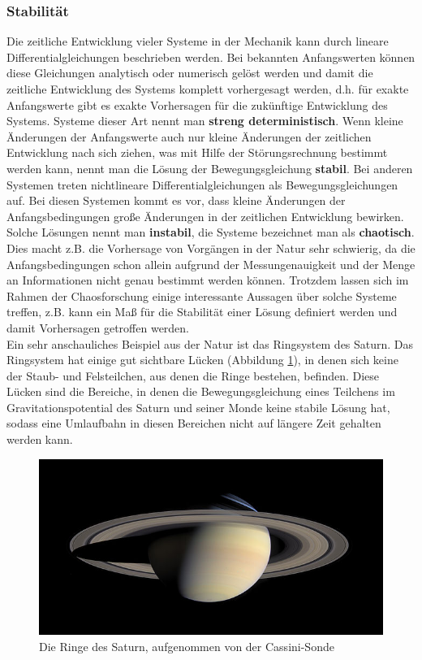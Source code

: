 \subsubsection{Stabilität}
Die zeitliche Entwicklung vieler Systeme in der Mechanik kann durch lineare Differentialgleichungen beschrieben werden. Bei bekannten Anfangswerten können diese Gleichungen analytisch oder numerisch gelöst werden und damit die zeitliche Entwicklung des Systems komplett vorhergesagt werden, d.h. für exakte Anfangswerte gibt es exakte Vorhersagen für die zukünftige Entwicklung des Systems. Systeme dieser Art nennt man \textbf{streng deterministisch}. Wenn kleine Änderungen der Anfangswerte auch nur kleine Änderungen der zeitlichen Entwicklung nach sich ziehen, was mit Hilfe der Störungsrechnung bestimmt werden kann, nennt man die Lösung der Bewegungsgleichung \textbf{stabil}.
Bei anderen Systemen treten nichtlineare Differentialgleichungen als Bewegungsgleichungen auf. Bei diesen Systemen kommt es vor, dass kleine Änderungen der Anfangsbedingungen große Änderungen in der zeitlichen Entwicklung bewirken. Solche Lösungen nennt man  \textbf{instabil}, die Systeme bezeichnet man als \textbf{chaotisch}. Dies macht z.B. die Vorhersage von Vorgängen in der Natur sehr schwierig, da die Anfangsbedingungen schon allein aufgrund der Messungenauigkeit und der Menge an Informationen nicht genau bestimmt werden können. Trotzdem lassen sich im Rahmen der Chaosforschung einige interessante Aussagen über solche Systeme treffen, z.B. kann ein Maß für die Stabilität einer Lösung definiert werden und damit Vorhersagen getroffen werden.
\\

Ein sehr anschauliches Beispiel aus der Natur ist das Ringsystem des Saturn. Das Ringsystem hat einige gut sichtbare Lücken (Abbildung \ref{foto-saturn}), in denen sich keine der Staub- und Felsteilchen, aus denen die Ringe bestehen, befinden. Diese Lücken sind die Bereiche, in denen die Bewegungsgleichung eines Teilchens im Gravitationspotential des Saturn und seiner Monde keine stabile Lösung hat, sodass eine Umlaufbahn in diesen Bereichen nicht auf längere Zeit gehalten werden kann.
\\
\begin{figure}
\includegraphics[width=1.0\textwidth]{images/saturn.jpg}
\caption{Die Ringe des Saturn, aufgenommen von der Cassini-Sonde}
\label{foto-saturn}
\end{figure}

